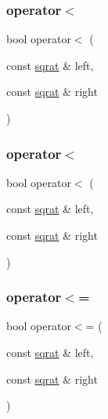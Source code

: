 \mbox{\label{classsqrat_a1326bc7564a14f2fa4cbe59cdcf94b69}} 
\subsubsection{\texorpdfstring{operator$<$}{operator<}\hspace{0.1cm}{\footnotesize\ttfamily [1/2]}}
{\footnotesize\ttfamily bool operator$<$ (\begin{DoxyParamCaption}\item[{const \mbox{\hyperlink{classsqrat}{sqrat}} \&}]{left,  }\item[{const \mbox{\hyperlink{classsqrat}{sqrat}} \&}]{right }\end{DoxyParamCaption})\hspace{0.3cm}{\ttfamily [friend]}}

\mbox{\label{classsqrat_a1326bc7564a14f2fa4cbe59cdcf94b69}} 
\subsubsection{\texorpdfstring{operator$<$}{operator<}\hspace{0.1cm}{\footnotesize\ttfamily [2/2]}}
{\footnotesize\ttfamily bool operator$<$ (\begin{DoxyParamCaption}\item[{const \mbox{\hyperlink{classsqrat}{sqrat}} \&}]{left,  }\item[{const \mbox{\hyperlink{classsqrat}{sqrat}} \&}]{right }\end{DoxyParamCaption})\hspace{0.3cm}{\ttfamily [friend]}}

\mbox{\label{classsqrat_ae33aee8490a3137fb967fbd52b100f6d}} 
\subsubsection{\texorpdfstring{operator$<$=}{operator<=}\hspace{0.1cm}{\footnotesize\ttfamily [1/2]}}
{\footnotesize\ttfamily bool operator$<$= (\begin{DoxyParamCaption}\item[{const \mbox{\hyperlink{classsqrat}{sqrat}} \&}]{left,  }\item[{const \mbox{\hyperlink{classsqrat}{sqrat}} \&}]{right }\end{DoxyParamCaption})\hspace{0.3cm}{\ttfamily [friend]}}

